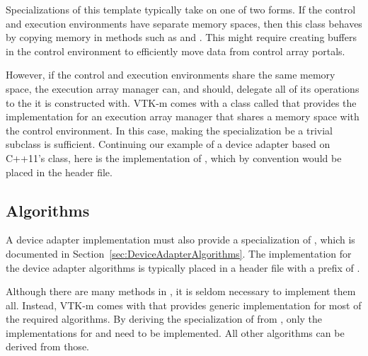 Specializations of this template typically take on one of two forms. If the
control and execution environments have separate memory spaces, then this
class behaves by copying memory in methods such as
 and . This might
require creating buffers in the control environment to efficiently move
data from control array portals.

However, if the control and execution environments share the same memory
space, the execution array manager can, and should, delegate all of its
operations to the  it is constructed with. VTK-m
comes with a class called
 that provides the
implementation for an execution array manager that shares a memory space
with the control environment. In this case, making the
 specialization be a trivial subclass
is sufficient. Continuing our example of a device adapter based on C++11's
 class, here is the implementation of
, which by convention would be placed
in the
header file.



\subsection{Algorithms}


A device adapter implementation must also provide a specialization of
, which is documented in
Section~\ref{sec:DeviceAdapterAlgorithms}. The implementation for the
device adapter algorithms is typically placed in a header file with a
prefix of .

Although there are many methods in ,
it is seldom necessary to implement them all. Instead, VTK-m comes with
 that provides generic
implementation for most of the required algorithms. By deriving the
specialization of  from
, only the implementations
for  and  need to be implemented.
All other algorithms can be derived from those.

